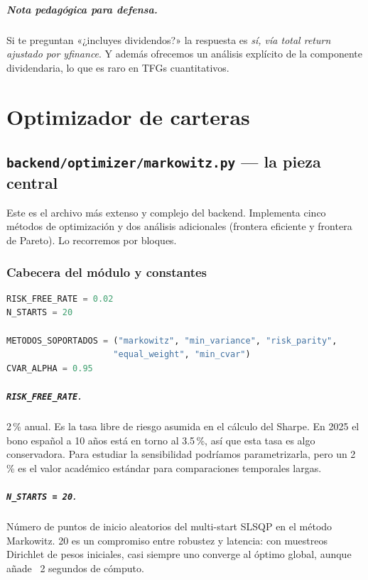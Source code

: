\documentclass[11pt,a4paper]{book}
\begin{document}
\paragraph{Nota pedagógica para defensa.} Si te preguntan «¿incluyes dividendos?» la respuesta es \emph{sí, vía total return ajustado por yfinance}. Y además ofrecemos un análisis explícito de la componente dividendaria, lo que es raro en TFGs cuantitativos.

\chapter{Optimizador de carteras}

\section{\texttt{backend/optimizer/markowitz.py} --- la pieza central}

Este es el archivo más extenso y complejo del backend. Implementa cinco métodos de optimización y dos análisis adicionales (frontera eficiente y frontera de Pareto). Lo recorremos por bloques.

\subsection{Cabecera del módulo y constantes}

\begin{lstlisting}[language=Python,caption={Constantes globales}]
RISK_FREE_RATE = 0.02
N_STARTS = 20

METODOS_SOPORTADOS = ("markowitz", "min_variance", "risk_parity",
                     "equal_weight", "min_cvar")
CVAR_ALPHA = 0.95
\end{lstlisting}

\paragraph{\texttt{RISK\_FREE\_RATE}.} 2\,\% anual. Es la tasa libre de riesgo asumida en el cálculo del Sharpe. En 2025 el bono español a 10 años está en torno al 3.5\,\%, así que esta tasa es algo conservadora. Para estudiar la sensibilidad podríamos parametrizarla, pero un 2\,\% es el valor académico estándar para comparaciones temporales largas.

\paragraph{\texttt{N\_STARTS = 20}.} Número de puntos de inicio aleatorios del multi-start SLSQP en el método Markowitz. 20 es un compromiso entre robustez y latencia: con muestreos Dirichlet de pesos iniciales, casi siempre uno converge al óptimo global, aunque añade ~2 segundos de cómputo.
\end{document}
